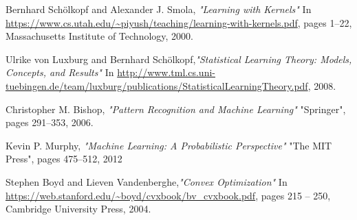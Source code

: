 \documentclass{article}
\begin{document}
\begin{thebibliography}{1}

Bernhard Schölkopf and Alexander J. Smola, \textit{"Learning with Kernels"}
\newblock In \url{https://www.cs.utah.edu/~piyush/teaching/learning-with-kernels.pdf}, pages 1--22, Massachusetts Institute of Technology, 2000.

Ulrike von Luxburg and Bernhard Schölkopf,\textit{"Statistical Learning Theory: Models, Concepts, and Results"}
\newblock In \url{http://www.tml.cs.uni-tuebingen.de/team/luxburg/publications/StatisticalLearningTheory.pdf}, 2008.

Christopher M. Bishop, \textit{"Pattern Recognition and Machine Learning"}
\newblock "Springer", pages 291--353, 2006.

Kevin P. Murphy, \textit{"Machine Learning: A Probabilistic Perspective"}
\newblock "The MIT Press", pages 475--512, 2012 

Stephen Boyd and Lieven Vandenberghe,\textit{"Convex Optimization"}
\newblock In \url{https://web.stanford.edu/~boyd/cvxbook/bv_cvxbook.pdf}, pages 215 -- 250, Cambridge University Press, 2004.

\end{thebibliography}
\end{document}

